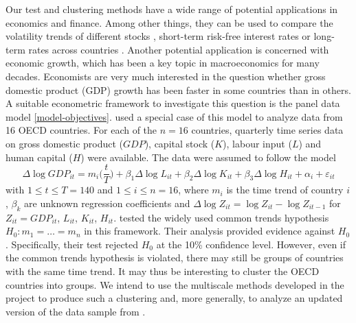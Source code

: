 \documentclass[a4paper,12pt]{article}
\begin{document}
\noindent Our test and clustering methods have a wide range of potential applications in economics and finance. Among other things, they can be used to compare the volatility trends of different stocks \citep{Nyblom2000}, short-term risk-free interest rates \citep{Fan2008,Park2009} or long-term rates across countries \citep{Park2009}.
Another potential application is concerned with economic growth, which has been a key topic in macroeconomics for many decades. Economists are very much interested in the question whether gross domestic product (GDP) growth has been faster in some countries than in others. A suitable econometric framework to investigate this question is the panel data model \eqref{model-objectives}. \cite{Zhang2012} used a special case of this model to analyze data from 16 OECD countries. For each of the $n=16$ countries, quarterly time series data on gross domestic product ($GDP$), capital stock ($K$), labour input ($L$) and human capital ($H$) were available. The data were assumed to follow the model 
\[ \Delta \log GDP_{it} = m_i\Big(\frac{t}{T}\Big) + \beta_1 \Delta \log L_{it} + \beta_2 \Delta \log K_{it} + \beta_3 \Delta \log H_{it} + \alpha_i + \varepsilon_{it} \]
with $1 \le t \le T = 140$ and $1 \le i \le n = 16$, where $m_i$ is the time trend of country $i$, $\beta_k$ are unknown regression coefficients and $\Delta \log Z_{it} = \log Z_{it} - \log Z_{it-1}$ for $Z_{it} = GDP_{it}$, $L_{it}$, $K_{it}$, $H_{it}$. \cite{Zhang2012} tested the widely used common trends hypothesis $H_0: m_1 = \ldots = m_n$ in this framework. Their analysis provided evidence against $H_0$. Specifically, their test rejected $H_0$ at the 10\% confidence level. However, even if the common trends hypothesis is violated, there may still be groups of countries with the same time trend. It may thus be interesting to cluster the OECD countries into groups. We intend to use the multiscale methods developed in the project to produce such a clustering and, more generally, to analyze an updated version of the data sample from \cite{Zhang2012}. 
\end{document}
